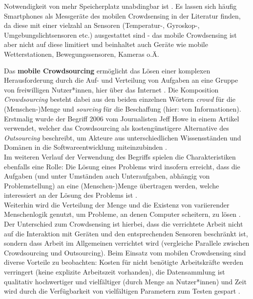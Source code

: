 Notwendigkeit von mehr Speicherplatz unabdingbar ist \cite{Ray2022}. Es lassen sich häufig Smartphones als Messgeräte des mobilen Crowdsensing in der Literatur finden, da diese mit einer vielzahl an Sensoren (Temperatur-, Gyroskop-, Umgebungslichtsensoren etc.) ausgestattet sind - das mobile Crowdsensing ist aber nicht auf diese limitiert und beinhaltet auch Geräte wie mobile Wetterstationen, Bewegungssensoren, Kameras o.Ä.


Das \textbf{mobile Crowdsourcing} ermöglicht das Lösen einer komplexen Herausforderung durch die Auf- und Verteilung von Aufgaben an eine Gruppe von freiwilligen Nutzer*innen, hier über das Internet \cite {Wang2019}. Die Komposition \textit{Crowdsourcing} besteht dabei aus den beiden einzelnen Wörtern \textit{crowd} für die (Menschen-)Menge und \textit{sourcing} für die Beschaffung (hier: von Informationen). Erstmalig wurde der Begriff 2006 vom Journalisten Jeff Howe in einem Artikel verwendet, welcher das Crowdsourcing als kostengünstigere Alternative des \textit{Outsourcing} beschreibt, um Akteure aus unterschiedlichen Wissensständen und Domänen in die Softwareentwicklung miteinzubinden \cite{Howe2006}. \\ Im weiteren Verlauf der Verwendung des Begriffs spielen die Charakteristiken ebenfalls eine Rolle: Die Lösung eines Problems wird insofern erreicht, dass die Aufgaben (und unter Umständen auch Unteraufgaben, abhängig von Problemstellung) an eine (Menschen-)Menge übertragen werden, welche interessiert an der Lösung des Problems ist \cite{Ray2022}. \\ Weiterhin wird die Verteilung der Menge und die Existenz von variierender Menschenlogik genutzt, um Probleme, an denen Computer scheitern, zu lösen \cite{Ray2022}. Der Unterschied zum Crowdsensing ist hierbei, dass die verrichtete Arbeit nicht auf die Interaktion mit Geräten und den entsprechenden Sensoren beschränkt ist, sondern dass Arbeit im Allgemeinen verrichtet wird (vergleiche Parallele zwischen Crowdsourcing und Outsourcing). Beim Einsatz vom mobilen Crowdsensing sind diverse Vorteile zu beobachten: Kosten für nicht benötigte Arbeitskräfte werden verringert (keine explizite Arbeitszeit vorhanden), die Datensammlung ist qualitativ hochwertiger und vielfältiger (durch Menge an Nutzer*innen) und Zeit wird durch die Verfügbarkeit von vielfältigen Parametern zum Testen gespart \cite{Ray2022}.


